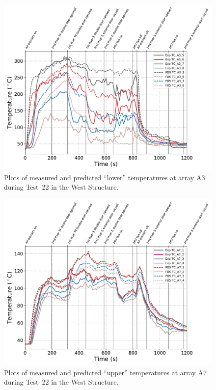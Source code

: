\begin{figure}[!h]
	\centering
	\includegraphics[width=\columnwidth]{Figures/Plots/Validation/Temperature/Test_22_TC_A3_lower}
	\caption{Plots of measured and predicted ``lower'' temperatures at array A3 during Test~22 in the West Structure.}
	\label{fig:TCA3_lower_data_Test22}
\end{figure}

\begin{figure}[!h]
	\centering
	\includegraphics[width=\columnwidth]{Figures/Plots/Validation/Temperature/Test_22_TC_A7_upper}
	\caption{Plots of measured and predicted ``upper'' temperatures at array A7 during Test~22 in the West Structure.}
	\label{fig:TCA7_upper_data_Test22}
\end{figure}


